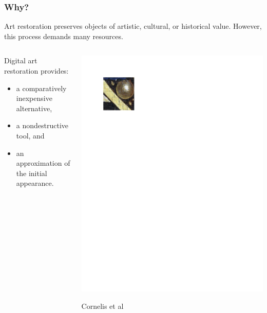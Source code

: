 \documentclass{beamer}
\begin{document}
\begin{frame}
\frametitle{Why?}
Art restoration preserves objects of artistic, cultural, or historical value.
\linebreak
However, this process demands many resources.
\begin{columns}
\begin{column}{0.5\textwidth}
Digital art restoration provides:
\begin{itemize}
\item a comparatively inexpensive alternative,
\item a nondestructive tool, and
\item an approximation of the initial appearance.
\end{itemize}
\end{column}
\begin{column}{0.5\textwidth}
\includegraphics[width=1\textwidth,trim={0.5in 8.4in 5.5in 0.75in},clip]{ghent_altarpiece_original}
\begin{center}
\tiny Cornelis et al
\end{center}
\end{column}
\end{columns}
\end{frame}
\end{document}
